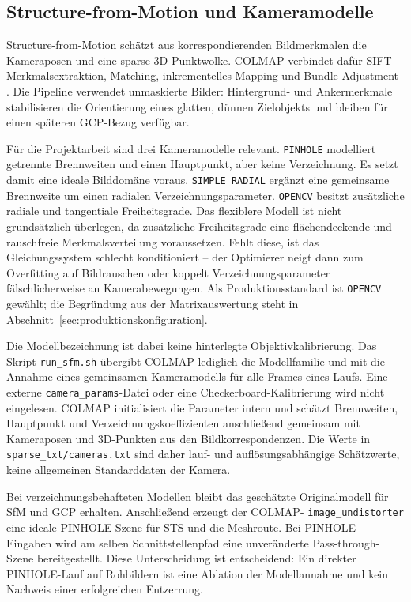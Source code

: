 \subsection{Structure-from-Motion und Kameramodelle}

Structure-from-Motion schätzt aus korrespondierenden Bildmerkmalen die
Kameraposen und eine sparse 3D-Punktwolke. COLMAP verbindet dafür
SIFT-Merkmalsextraktion, Matching, inkrementelles Mapping und Bundle Adjustment
\parencite{schoenberger2016sfm}. Die Pipeline verwendet unmaskierte Bilder:
Hintergrund- und Ankermerkmale stabilisieren die Orientierung eines glatten,
dünnen Zielobjekts und bleiben für einen späteren GCP-Bezug verfügbar.

Für die Projektarbeit sind drei Kameramodelle relevant. \texttt{PINHOLE}
modelliert getrennte Brennweiten und einen Hauptpunkt, aber keine Verzeichnung. Es setzt damit eine
ideale Bilddomäne voraus. \texttt{SIMPLE\_RADIAL} ergänzt eine gemeinsame
Brennweite um einen radialen Verzeichnungsparameter. \texttt{OPENCV} besitzt
zusätzliche radiale und tangentiale Freiheitsgrade. Das flexiblere Modell ist
nicht grundsätzlich überlegen, da zusätzliche Freiheitsgrade eine
flächendeckende und rauschfreie Merkmalsverteilung voraussetzen. Fehlt diese,
ist das Gleichungssystem schlecht konditioniert – der Optimierer neigt dann
zum Overfitting auf Bildrauschen oder koppelt Verzeichnungsparameter
fälschlicherweise an Kamerabewegungen. Als Produktionsstandard
ist \texttt{OPENCV} gewählt; die Begründung aus der Matrixauswertung steht in
Abschnitt~\ref{sec:produktionskonfiguration}.

Die Modellbezeichnung ist dabei keine hinterlegte Objektivkalibrierung. Das
Skript \texttt{run\_sfm.sh} übergibt COLMAP lediglich die Modellfamilie und mit
 die Annahme eines gemeinsamen
Kameramodells für alle Frames eines Laufs. Eine externe
\texttt{camera\_params}-Datei oder eine Checkerboard-Kalibrierung wird nicht
eingelesen. COLMAP initialisiert die Parameter intern und schätzt Brennweiten,
Hauptpunkt und Verzeichnungskoeffizienten anschließend gemeinsam mit
Kameraposen und 3D-Punkten aus den Bildkorrespondenzen. Die Werte in
\texttt{sparse\_txt/cameras.txt} sind daher lauf- und auflösungsabhängige
Schätzwerte, keine allgemeinen Standarddaten der Kamera.

Bei verzeichnungsbehafteten Modellen bleibt das geschätzte Originalmodell für
SfM und GCP erhalten. Anschließend erzeugt der COLMAP-
\texttt{image\_undistorter} eine ideale PINHOLE-Szene für STS und die
Meshroute. Bei PINHOLE-Eingaben wird am selben Schnittstellenpfad eine
unveränderte Pass-through-Szene bereitgestellt. Diese Unterscheidung ist
entscheidend: Ein direkter PINHOLE-Lauf auf Rohbildern ist eine Ablation der
Modellannahme und kein Nachweis einer erfolgreichen Entzerrung.

